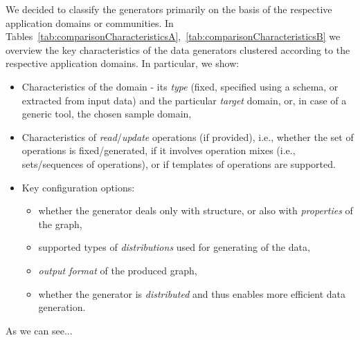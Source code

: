 %

We decided to classify the generators primarily on the basis of the respective application domains or communities. In Tables~\ref{tab:comparisonCharacteristicsA},~\ref{tab:comparisonCharacteristicsB}   we overview the key characteristics of the data generators clustered according to the respective application domains. In particular, we show:

\begin{itemize}
\item Characteristics of the domain - its \textit{type} (fixed, specified using a schema, or extracted from input data) and the particular \textit{target} domain, or, in case of a generic tool, the chosen sample domain,
\item Characteristics of \textit{read}/\textit{update} operations (if provided), i.e., whether the set of operations is fixed/generated, if it involves operation mixes (i.e., sets/sequences of operations), or if templates of operations are supported.
\item Key configuration options:
  \begin{itemize}
    \item whether the generator deals only with structure, or also with \textit{properties} of the graph,
    \item supported types of \textit{distributions} used for generating of the data,
    \item \textit{output format} of the produced graph,
    \item  whether the generator is \textit{distributed} and thus enables more efficient data generation.
  \end{itemize}
\end{itemize}

As we can see...

